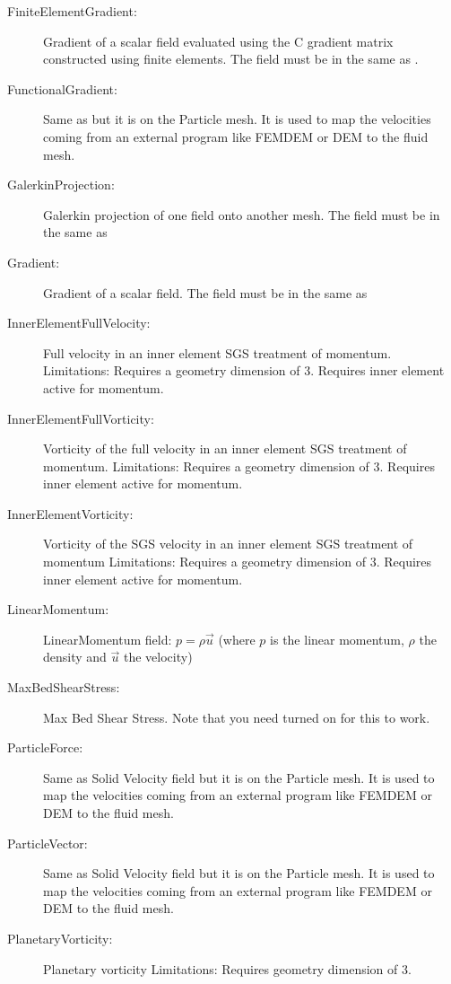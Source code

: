 \begin{description}
 \item[FiniteElementGradient:]Gradient of a scalar field evaluated using the C gradient matrix constructed using finite elements. The field must be in the same  as . 
  \item[FunctionalGradient:]Same as  but it is on the Particle mesh. It is used to map the velocities coming from an external program like FEMDEM or DEM to the fluid mesh.    
 \item[GalerkinProjection:]Galerkin projection of one field onto another mesh. The field must be in the same  as      
 \item[Gradient:]Gradient of a scalar field. The field must be in the same  as 
 \item[InnerElementFullVelocity:]Full velocity in an inner element SGS treatment of momentum.
  Limitations: Requires a geometry dimension of 3. Requires inner element active for momentum. 
 \item[InnerElementFullVorticity:]Vorticity of the full velocity in an inner element SGS treatment of momentum.
  Limitations: Requires a geometry dimension of 3. Requires inner element active for momentum. 
 \item[InnerElementVorticity:]Vorticity of the SGS velocity in an inner element SGS treatment of momentum
  Limitations: Requires a geometry dimension of 3. Requires inner element active for momentum.
 \item[LinearMomentum:]LinearMomentum field: $p = \rho \vec{u}$ (where $p$ is the linear momentum, $\rho$ the density and $\vec{u}$ the velocity)
 \item[MaxBedShearStress:]Max Bed Shear Stress. Note that you need  turned on for this to work.    
 \item[ParticleForce:] Same as Solid Velocity field but it is on the Particle mesh. It is used to map the velocities coming from an external program like FEMDEM or DEM to the fluid mesh.       
 \item[ParticleVector:]Same as Solid Velocity field but it is on the Particle mesh. It is used to map the velocities coming from an external program like FEMDEM or DEM to the fluid mesh.   
 \item[PlanetaryVorticity:]Planetary vorticity
	Limitations: Requires geometry dimension of 3. 

\end{description}
